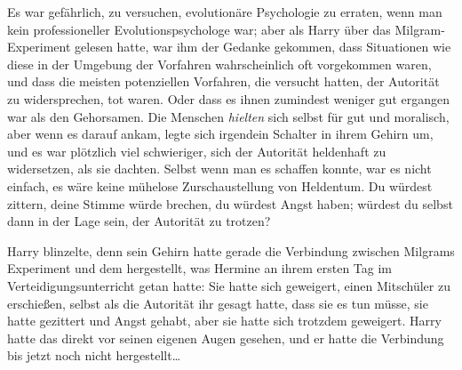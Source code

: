 Es war gefährlich, zu versuchen, evolutionäre Psychologie zu erraten, wenn man kein professioneller Evolutionspsychologe war; aber als Harry über das Milgram-Experiment gelesen hatte, war ihm der Gedanke gekommen, dass Situationen wie diese in der Umgebung der Vorfahren wahrscheinlich oft vorgekommen waren, und dass die meisten potenziellen Vorfahren, die versucht hatten, der Autorität zu widersprechen, tot waren. Oder dass es ihnen zumindest weniger gut ergangen war als den Gehorsamen. Die Menschen \emph{hielten} sich selbst für gut und moralisch, aber wenn es darauf ankam, legte sich irgendein Schalter in ihrem Gehirn um, und es war plötzlich viel schwieriger, sich der Autorität heldenhaft zu widersetzen, als sie dachten. Selbst wenn man es schaffen konnte, war es nicht einfach, es wäre keine mühelose Zurschaustellung von Heldentum. Du würdest zittern, deine Stimme würde brechen, du würdest Angst haben; würdest du selbst dann in der Lage sein, der Autorität zu trotzen?

Harry blinzelte, denn sein Gehirn hatte gerade die Verbindung zwischen Milgrams Experiment und dem hergestellt, was Hermine an ihrem ersten Tag im Verteidigungsunterricht getan hatte: Sie hatte sich geweigert, einen Mitschüler zu erschießen, selbst als die Autorität ihr gesagt hatte, dass sie es tun müsse, sie hatte gezittert und Angst gehabt, aber sie hatte sich trotzdem geweigert. Harry hatte das direkt vor seinen eigenen Augen gesehen, und er hatte die Verbindung bis jetzt noch nicht hergestellt…

